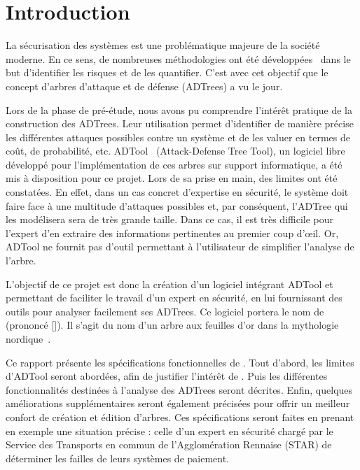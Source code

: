 \section{Introduction}
	La sécurisation des systèmes est une problématique majeure de la société moderne. En ce sens, de nombreuses méthodologies ont été développées~\cite{introSecurite,ADTreeKordy} dans le but d'identifier les risques et de les quantifier. C'est avec cet objectif que le concept d'arbres d'attaque et de défense (ADTrees) a vu le jour.

	Lors de la phase de pré-étude, nous avons pu comprendre l’intérêt pratique de la construction des ADTrees. Leur utilisation permet d'identifier de manière précise les différentes attaques possibles contre un système et de les valuer en termes de coût, de probabilité, etc. ADTool~\cite{adtool_paper} (Attack-Defense Tree Tool), un logiciel libre développé pour l'implémentation de ces arbres sur support informatique, a été mis à disposition pour ce projet. Lors de sa prise en main, des limites ont été constatées. En effet, dans un cas concret d'expertise en sécurité, le système doit faire face à une multitude d'attaques possibles et, par conséquent, l'ADTree qui les modélisera sera de très grande taille. Dans ce cas, il est très difficile pour l'expert d'en extraire des informations pertinentes au premier coup d’œil. Or, ADTool ne fournit pas d'outil permettant à l'utilisateur de simplifier l'analyse de l'arbre. 

	L'objectif de ce projet est donc la création d'un logiciel intégrant ADTool et permettant de faciliter le travail d'un expert en sécurité, en lui fournissant des outils pour analyser facilement ses ADTrees. Ce logiciel portera le nom de \glasir{}  (prononcé []). Il s'agit du nom d'un arbre aux feuilles d'or dans la mythologie nordique~\cite{vikingCulture}.

	Ce rapport présente les spécifications fonctionnelles de \glasir{}. Tout d'abord, les limites d'ADTool seront abordées, afin de justifier l'intérêt de \glasir{}. Puis les différentes fonctionnalités destinées à l'analyse des ADTrees seront décrites. Enfin, quelques améliorations supplémentaires seront également précisées pour offrir un meilleur confort de création et édition d'arbres. Ces spécifications seront faites en prenant en exemple une situation précise : celle d'un expert en sécurité chargé par le Service des Transports en commun de l'Agglomération Rennaise (STAR) de déterminer les failles de leurs systèmes de paiement.